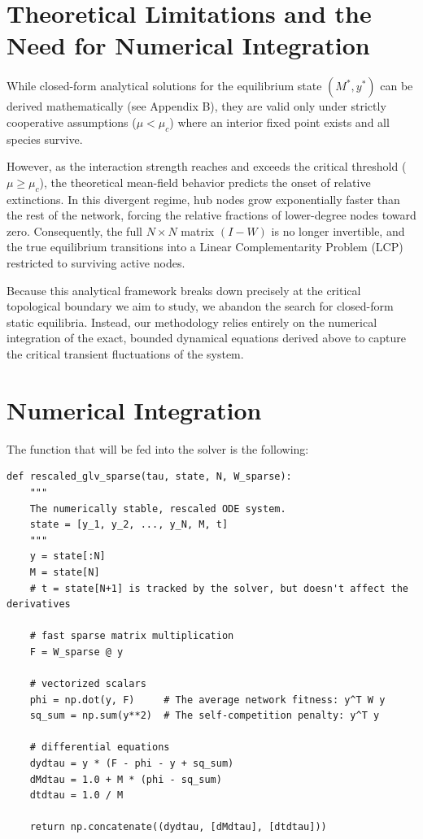 \section{Theoretical Limitations and the Need for Numerical Integration}

While closed-form analytical solutions for the equilibrium state $(M^*, y^*)$ can be derived mathematically (see Appendix B), they are valid only under strictly cooperative assumptions ($\mu < \mu_c$) where an interior fixed point exists and all species survive.

However, as the interaction strength reaches and exceeds the critical threshold ($\mu \ge \mu_c$), the theoretical mean-field behavior predicts the onset of relative extinctions. In this divergent regime, hub nodes grow exponentially faster than the rest of the network, forcing the relative fractions of lower-degree nodes toward zero. Consequently, the full $N \times N$ matrix $(I-W)$ is no longer invertible, and the true equilibrium transitions into a Linear Complementarity Problem (LCP) restricted to surviving active nodes.

Because this analytical framework breaks down precisely at the critical topological boundary we aim to study, we abandon the search for closed-form static equilibria. Instead, our methodology relies entirely on the numerical integration of the exact, bounded dynamical equations derived above to capture the critical transient fluctuations of the system.

\section{Numerical Integration}

The function that will be fed into the solver is the following:

\noindent
\begin{minipage}{\textwidth}
\begin{verbatim}
def rescaled_glv_sparse(tau, state, N, W_sparse):
    """
    The numerically stable, rescaled ODE system.
    state = [y_1, y_2, ..., y_N, M, t]
    """
    y = state[:N]
    M = state[N]
    # t = state[N+1] is tracked by the solver, but doesn't affect the derivatives

    # fast sparse matrix multiplication
    F = W_sparse @ y

    # vectorized scalars
    phi = np.dot(y, F)     # The average network fitness: y^T W y
    sq_sum = np.sum(y**2)  # The self-competition penalty: y^T y

    # differential equations
    dydtau = y * (F - phi - y + sq_sum)
    dMdtau = 1.0 + M * (phi - sq_sum)
    dtdtau = 1.0 / M

    return np.concatenate((dydtau, [dMdtau], [dtdtau]))
\end{verbatim}
\end{minipage}

